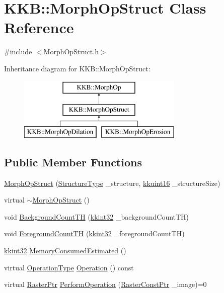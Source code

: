 \hypertarget{class_k_k_b_1_1_morph_op_struct}{}\section{K\+KB\+:\+:Morph\+Op\+Struct Class Reference}
\label{class_k_k_b_1_1_morph_op_struct}


{\ttfamily \#include $<$Morph\+Op\+Struct.\+h$>$}

Inheritance diagram for K\+KB\+:\+:Morph\+Op\+Struct\+:\begin{figure}[H]
\begin{center}
\leavevmode
\includegraphics[height=3.000000cm]{class_k_k_b_1_1_morph_op_struct}
\end{center}
\end{figure}
\subsection*{Public Member Functions}
\begin{DoxyCompactItemize}
\item 
\hyperlink{class_k_k_b_1_1_morph_op_struct_afbd23fee4ea441d03f11f10da50009f6}{Morph\+Op\+Struct} (\hyperlink{class_k_k_b_1_1_morph_op_a09e4aff7e81327849855ff72082d85b3}{Structure\+Type} \+\_\+structure, \hyperlink{namespace_k_k_b_aa8c7d4d30381c8a0b6fce68974a9c8a9}{kkuint16} \+\_\+structure\+Size)
\item 
virtual \hyperlink{class_k_k_b_1_1_morph_op_struct_a8535190dc3f3adaacce0854484e2ab81}{$\sim$\+Morph\+Op\+Struct} ()
\item 
void \hyperlink{class_k_k_b_1_1_morph_op_struct_a26156e34cbbce4b4bb719f1704b2ef87}{Background\+Count\+TH} (\hyperlink{namespace_k_k_b_a8fa4952cc84fda1de4bec1fbdd8d5b1b}{kkint32} \+\_\+background\+Count\+TH)
\item 
void \hyperlink{class_k_k_b_1_1_morph_op_struct_a1c39494821bbc43e170455a54b3427bc}{Foreground\+Count\+TH} (\hyperlink{namespace_k_k_b_a8fa4952cc84fda1de4bec1fbdd8d5b1b}{kkint32} \+\_\+foreground\+Count\+TH)
\item 
\hyperlink{namespace_k_k_b_a8fa4952cc84fda1de4bec1fbdd8d5b1b}{kkint32} \hyperlink{class_k_k_b_1_1_morph_op_struct_ae3dc1e5cfafcd323d593c50bcf08315e}{Memory\+Consumed\+Estimated} ()
\item 
virtual \hyperlink{class_k_k_b_1_1_morph_op_a32070d9c14d16849873a8a409f5b0d69}{Operation\+Type} \hyperlink{class_k_k_b_1_1_morph_op_struct_a3cbbeb9ce7ce8856bc01d1c0b1b478a8}{Operation} () const 
\item 
virtual \hyperlink{namespace_k_k_b_a80d46bd24db644a022c863bce8ae3633}{Raster\+Ptr} \hyperlink{class_k_k_b_1_1_morph_op_struct_ace5b649ea317fcc38094e64bb5034380}{Perform\+Operation} (\hyperlink{namespace_k_k_b_a5acfa7402dc4df1769f90d3dc8ddfc2c}{Raster\+Const\+Ptr} \+\_\+image)=0
\end{DoxyCompactItemize}
